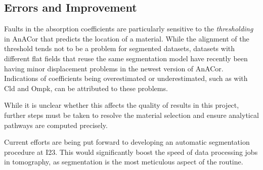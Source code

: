 
\subsection{Errors and Improvement}

Faults in the absorption coefficients are particularly sensitive to the \textit{thresholding} in AnACor that predicts the location of a material. While the alignment of the threshold tends not to be a problem for segmented datasets, datasets with different flat fields that reuse the same segmentation model have recently been having minor displacement problems in the newest version of AnACor. Indications of coefficients being overestimated or underestimated, such as with Cld and Ompk, can be attributed to these problems.  

While it is unclear whether this affects the quality of results in this project, further steps must be taken to resolve the material selection and ensure analytical pathways are computed precisely.

Current efforts are being put forward to developing an automatic segmentation procedure at I23. This would significantly boost the speed of data processing jobs in tomography, as segmentation is the most meticulous aspect of the routine.



